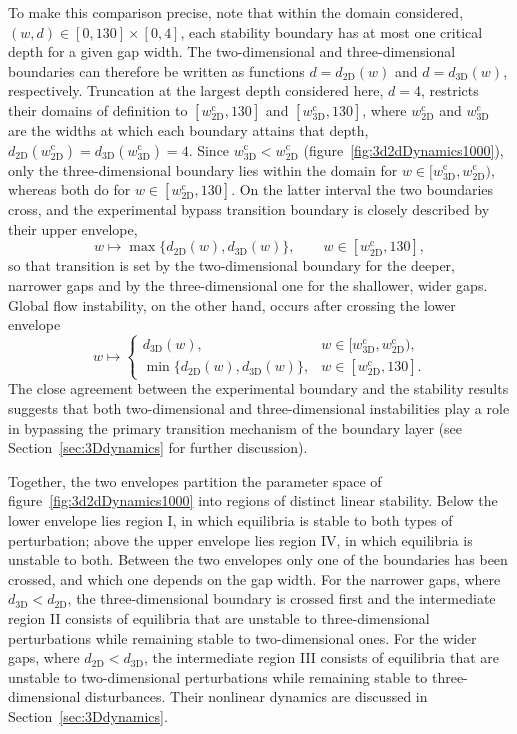 \documentclass[lineno]{jfm}
\begin{document}
To make this comparison precise, note that within the domain considered, $(w,d)\in[0,130]\times[0,4]$, each stability boundary has at most one critical depth for a given gap width. The two-dimensional and three-dimensional boundaries can therefore be written as functions $d=d_\mathrm{2D}(w)$ and $d=d_\mathrm{3D}(w)$, respectively. Truncation at the largest depth considered here, $d=4$, restricts their domains of definition to $[w_\mathrm{2D}^\mathrm{c},130]$ and $[w_\mathrm{3D}^\mathrm{c},130]$, where $w_\mathrm{2D}^\mathrm{c}$ and $w_\mathrm{3D}^\mathrm{c}$ are the widths at which each boundary attains that depth, $d_\mathrm{2D}(w_\mathrm{2D}^\mathrm{c})=d_\mathrm{3D}(w_\mathrm{3D}^\mathrm{c})=4$. Since $w_\mathrm{3D}^\mathrm{c}<w_\mathrm{2D}^\mathrm{c}$ (figure~\ref{fig:3d2dDynamics1000}), only the three-dimensional boundary lies within the domain for $w\in[w_\mathrm{3D}^\mathrm{c},w_\mathrm{2D}^\mathrm{c})$, whereas both do for $w\in[w_\mathrm{2D}^\mathrm{c},130]$. On the latter interval the two boundaries cross, and the experimental bypass transition boundary is closely described by their upper envelope,
\begin{equation}
	w\longmapsto\max\{d_\mathrm{2D}(w),d_\mathrm{3D}(w)\},\qquad w\in[w_\mathrm{2D}^\mathrm{c},130],
\end{equation}
so that transition is set by the two-dimensional boundary for the deeper, narrower gaps and by the three-dimensional one for the shallower, wider gaps. Global flow instability, on the other hand, occurs after crossing the lower envelope
\begin{equation}
	w\longmapsto
	\begin{cases}
		d_\mathrm{3D}(w),                        & w\in[w_\mathrm{3D}^\mathrm{c},w_\mathrm{2D}^\mathrm{c}), \\
		\min\{d_\mathrm{2D}(w),d_\mathrm{3D}(w)\}, & w\in[w_\mathrm{2D}^\mathrm{c},130].
	\end{cases}
\end{equation}
The close agreement between the experimental boundary and the stability results suggests that both two-dimensional and three-dimensional instabilities play a role in bypassing the primary transition mechanism of the boundary layer (see Section~\ref{sec:3Ddynamics} for further discussion).

Together, the two envelopes partition the parameter space of figure~\ref{fig:3d2dDynamics1000} into regions of distinct linear stability. Below the lower envelope lies region I, in which equilibria is stable to both types of perturbation; above the upper envelope lies region IV, in which equilibria is unstable to both. Between the two envelopes only one of the boundaries has been crossed, and which one depends on the gap width. For the narrower gaps, where $d_\mathrm{3D}<d_\mathrm{2D}$, the three-dimensional boundary is crossed first and the intermediate region II consists of equilibria that are unstable to three-dimensional perturbations while remaining stable to two-dimensional ones. For the wider gaps, where $d_\mathrm{2D}<d_\mathrm{3D}$, the intermediate region III consists of equilibria that are unstable to two-dimensional perturbations while remaining stable to three-dimensional disturbances. Their nonlinear dynamics are discussed in Section~\ref{sec:3Ddynamics}.
\end{document}
